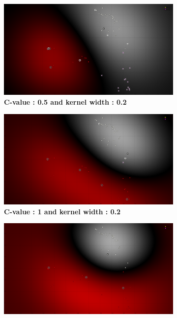 \begin{figure}[!ht]
\centering
\begin{subfigure}[t]{0.2\textwidth}
\includegraphics[height=0.08\textheight]{./classification/SVM_rbf_w_0_2_c_0_5_TR_25_.png}
\caption{\bf C-value : 0.5 and kernel width : 0.2}
\label{fig:SVM_rbf_w_0_2_c_0_5_TR_25_}
\end{subfigure}
\hfill
\begin{subfigure}[t]{0.2\textwidth}
\includegraphics[height=0.08\textheight]{./classification/SVM_rbf_w_0_2_c_1_TR_25_.png}
\caption{\bf C-value : 1 and kernel width : 0.2}
\label{fig:SVM_rbf_w_0_2_c_1_TR_25_}
\end{subfigure}%
\hfill
\begin{subfigure}[t]{0.2\textwidth}
\includegraphics[height=0.08\textheight]{./classification/SVM_rbf_w_0_2_c_10_TR_25_.png}

\end{subfigure}
\end{figure}
